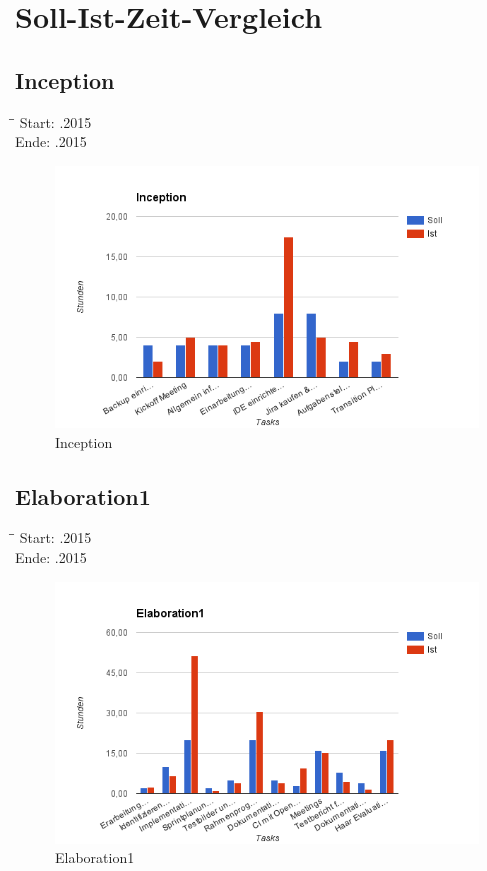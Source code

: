 \section{Soll-Ist-Zeit-Vergleich}

\subsection{Inception}
\begin{tabbing}[H]
    \hspace*{6cm}\=\hspace*{6cm}\= \kill
    Start: .2015 \\
	Ende: .2015 \\
\end{tabbing}
\begin{figure}[H]
\includegraphics[width=\textwidth]{images/inception.png}
\caption[Inception]{Inception}
\end{figure}

\subsection{Elaboration1}
\begin{tabbing}[H]
    \hspace*{6cm}\=\hspace*{6cm}\= \kill
    Start: .2015 \\
	Ende: .2015 \\
\end{tabbing}
\begin{figure}[H]
\includegraphics[width=\textwidth]{images/elab1.png}
\caption[Elaboration1]{Elaboration1}
\end{figure}

